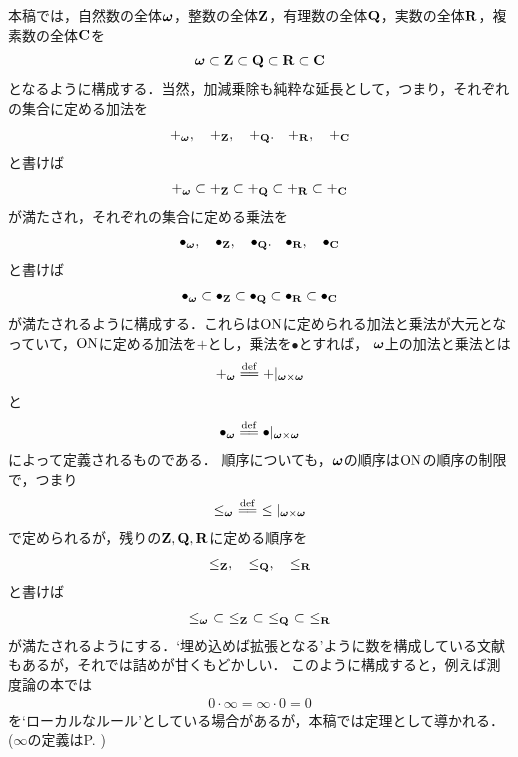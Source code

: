 本稿では，自然数の全体${\boldsymbol \omega}$，整数の全体$\mathbf{Z}$，有理数の全体$\mathbf{Q}$，実数の全体$\mathbf{R}$，複素数の全体$\mathbf{C}$を
\begin{align}
	{\boldsymbol \omega} \subset \mathbf{Z} \subset \mathbf{Q} \subset \mathbf{R} \subset \mathbf{C}
\end{align}
となるように構成する．当然，加減乗除も純粋な延長として，つまり，それぞれの集合に定める加法を
\begin{align}
	+_{\boldsymbol \omega},\quad +_{\mathbf{Z}},\quad +_{\mathbf{Q}}.\quad +_{\mathbf{R}},\quad +_{\mathbf{C}}
\end{align}
と書けば
\begin{align}
	+_{\boldsymbol \omega} \subset +_{\mathbf{Z}} \subset +_{\mathbf{Q}} \subset +_{\mathbf{R}} \subset +_{\mathbf{C}}
\end{align}
が満たされ，それぞれの集合に定める乗法を
\begin{align}
	\bullet_{\boldsymbol \omega},\quad \bullet_{\mathbf{Z}},\quad \bullet_{\mathbf{Q}}.\quad \bullet_{\mathbf{R}},\quad \bullet_{\mathbf{C}}
\end{align}
と書けば
\begin{align}
	\bullet_{\boldsymbol \omega} \subset \bullet_{\mathbf{Z}} \subset \bullet_{\mathbf{Q}} \subset \bullet_{\mathbf{R}} \subset \bullet_{\mathbf{C}}
\end{align}
が満たされるように構成する．これらは$\mathrm{ON}$に定められる加法と乗法が大元となっていて，$\mathrm{ON}$に定める加法を$+$とし，乗法を$\bullet$とすれば，
${\boldsymbol \omega}$上の加法と乗法とは
\begin{align}
	+_\Natural \defeq +|_{\Natural \times \Natural}
\end{align}
と
\begin{align}
	\bullet_\Natural \defeq \bullet|_{\Natural \times \Natural}
\end{align}
によって定義されるものである．
順序についても，${\boldsymbol \omega}$の順序は$\mathrm{ON}$の順序の制限で，つまり
\begin{align}
	\leq_\Natural\ \defeq\ \leq|_{\Natural \times \Natural}
\end{align}
で定められるが，残りの$\mathbf{Z},\mathbf{Q},\mathbf{R}$に定める順序を
\begin{align}
	\leq_{\mathbf{Z}},\quad \leq_{\mathbf{Q}},\quad \leq_{\mathbf{R}}
\end{align}
と書けば
\begin{align}
	\leq_{\boldsymbol \omega}\ \subset\ \leq_{\mathbf{Z}}\ \subset\ \leq_{\mathbf{Q}}\ \subset\ \leq_{\mathbf{R}}
\end{align}
が満たされるようにする．`埋め込めば拡張となる'ように数を構成している文献もあるが，それでは詰めが甘くもどかしい．
このように構成すると，例えば測度論の本では
\begin{align}
	0 \cdot \infty = \infty \cdot 0 = 0
\end{align}
を`ローカルなルール'としている場合があるが，本稿では定理として導かれる．
($\infty$の定義はP. \pageref{def:infinity})

